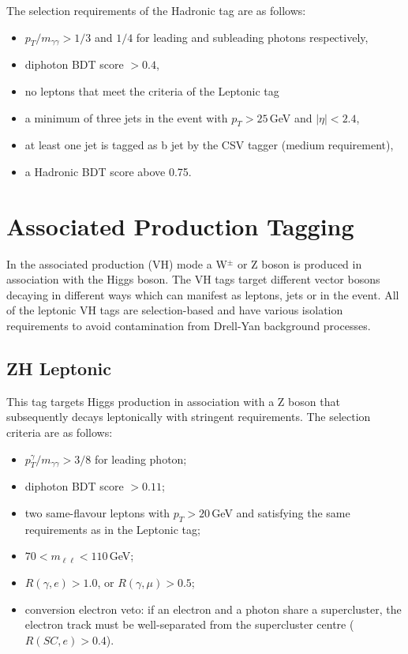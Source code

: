 The selection requirements of the \ttH Hadronic tag are as follows:
\begin{itemize}[noitemsep]
    \item $p_{T}/m_{\gamma\gamma} > 1/3$ and $1/4$ for leading and subleading photons respectively,
    \item diphoton BDT score $> 0.4$,
    \item no leptons that meet the criteria of the \ttH Leptonic tag
    \item a minimum of three jets in the event with $p_{T} > 25$\,GeV and $|\eta| < 2.4$,
    \item at least one jet is tagged as b jet by the CSV tagger (medium requirement),
    \item a \ttH Hadronic BDT score above 0.75.
\end{itemize}











\section[VH Tagging]{Associated Production Tagging}
In the associated production (VH) mode a W$^{\pm}$ or Z boson is produced in association with the Higgs boson. The VH tags target different vector bosons decaying in different ways which can manifest as leptons, jets or \MET in the event.
All of the leptonic VH tags are selection-based and have various isolation requirements to avoid contamination from Drell-Yan background processes.

\subsection{ZH Leptonic}
This tag targets Higgs production in association with a Z boson that subsequently decays leptonically with stringent requirements. The selection criteria are as follows:
\begin{itemize}[noitemsep]
    \item $p^{\gamma}_{T}/m_{\gamma\gamma} > 3/8$ for leading photon;
    \item diphoton BDT score $> 0.11$;
    \item two same-flavour leptons with $p_T > 20$\,GeV and satisfying the same requirements as in the \ttH Leptonic tag;
    \item $70 < m_{\ell\ell} < 110$\,GeV;
    \item $R(\gamma,e) > 1.0$, or $R(\gamma,\mu) > 0.5$;
    \item conversion electron veto: if an electron and a photon share a supercluster, the electron track must be well-separated from the supercluster centre ($R(SC,e) > 0.4$).
\end{itemize}



